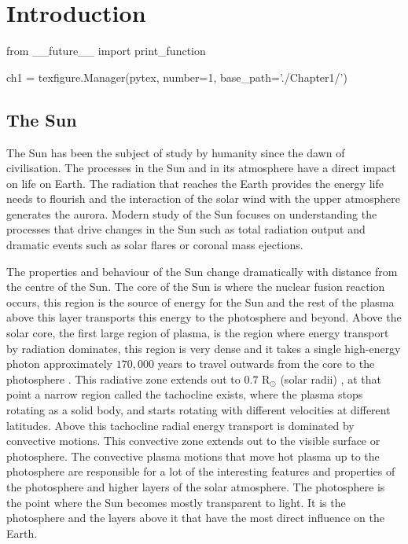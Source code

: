 \label{ch:Intro}
\chapter{Introduction}  %

\begin{pycode}[chapter1]
from __future__ import print_function

ch1 = texfigure.Manager(pytex, number=1, base_path='./Chapter1/')
\end{pycode}

\section{The Sun} %
The Sun has been the subject of study by humanity since the dawn of civilisation.
The processes in the Sun and in its atmosphere have a direct impact on life on Earth.
The radiation that reaches the Earth provides the energy life needs to flourish and the interaction of the solar wind with the upper atmosphere generates the aurora.
Modern study of the Sun focuses on understanding the processes that drive changes in the Sun such as total radiation output and dramatic events such as solar flares or coronal mass ejections.

The properties and behaviour of the Sun change dramatically with distance from the centre of the Sun.
The core of the Sun is where the nuclear fusion reaction occurs, this region is the source of energy for the Sun and the rest of the plasma above this layer transports this energy to the photosphere and beyond.
Above the solar core, the first large region of plasma, is the region where energy transport by radiation dominates, this region is very dense and it takes a single high-energy photon approximately $170,000$ years to travel outwards from the core to the photosphere \citep{priest2014}.
This radiative zone extends out to $0.7$ R$_\odot$ (solar radii) \citep{priest2014}, at that point a narrow region called the tachocline exists, where the plasma stops rotating as a solid body, and starts rotating with different velocities at different latitudes.
Above this tachocline radial energy transport is dominated by convective motions.
This convective zone extends out to the visible surface or photosphere.
The convective plasma motions that move hot plasma up to the photosphere are responsible for a lot of the interesting features and properties of the photosphere and higher layers of the solar atmosphere.
The photosphere is the point where the Sun becomes mostly transparent to light.
It is the photosphere and the layers above it that have the most direct influence on the Earth.

